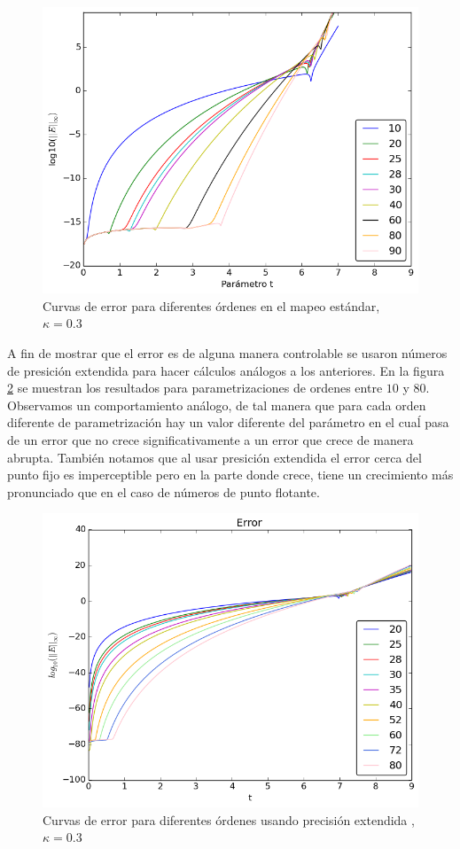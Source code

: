 \begin{figure}[H]
\centering
\includegraphics[scale=0.6]{error_estandar_orden}
\caption{Curvas de error para diferentes órdenes en el mapeo estándar,$\kappa=0.3$ }
\label{erroresf64}
\end{figure}
A fin de mostrar que el error es de alguna manera controlable se usaron números de presición extendida para hacer cálculos análogos a los anteriores. En la figura \ref{erroresBig} se muestran los resultados para parametrizaciones de ordenes entre $10$ y $80$. Observamos un comportamiento análogo, de tal manera que para cada orden diferente de parametrización hay un valor diferente del parámetro en el cuaĺ pasa de un error que no crece significativamente a un error que crece de manera abrupta. También notamos que al usar presición extendida el error cerca del punto fijo es imperceptible pero en la parte donde crece, tiene un crecimiento más pronunciado que en el caso de números de punto flotante. 

\begin{figure}[H]
\centering
\includegraphics[scale=0.6]{error_estandar_orden_big}
\caption{Curvas de error para diferentes órdenes usando precisión extendida ,$\kappa=0.3$ }
\label{erroresBig}
\end{figure}

